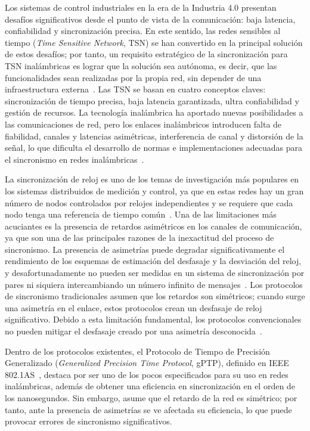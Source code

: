 Los sistemas de control industriales en la era de la Industria 4.0 presentan desafíos significativos desde el punto de vista de la comunicación: baja latencia, confiabilidad y sincronización precisa. En este sentido, las redes sensibles al tiempo (\textit{Time Sensitive Network}, TSN) se han convertido en la principal solución de estos desafíos; por tanto, un requisito estratégico de la sincronización para TSN inalámbricas es lograr que la solución sea autónoma, es decir, que las funcionalidades sean realizadas por la propia red, sin depender de una infraestructura externa~\cite{seijo2022}. Las TSN se basan en cuatro conceptos claves: sincronización de tiempo precisa, baja latencia garantizada, ultra confiabilidad y gestión de recursos. La tecnología inalámbrica ha aportado nuevas posibilidades a las comunicaciones de red, pero los enlaces inalámbricos introducen falta de fiabilidad, canales y latencias asimétricas, interferencia de canal y distorsión de la señal, lo que dificulta el desarrollo de normas e implementaciones adecuadas para el sincronismo en redes inalámbricas~\cite{mildner2019}.

La sincronización de reloj es uno de los temas de investigación más populares en los sistemas distribuidos de medición y control, ya que en estas redes hay un gran número de nodos controlados por relojes independientes y se requiere que cada nodo tenga una referencia de tiempo común~\cite{zhang2024}. Una de las limitaciones más acuciantes es la presencia de retardos asimétricos en los canales de comunicación, ya que son una de las principales razones de la inexactitud del proceso de sincronismo. La presencia de asimetrías puede degradar significativamente el rendimiento de los esquemas de estimación del desfasaje y la desviación del reloj, y desafortunadamente no pueden ser medidas en un sistema de sincronización por pares ni siquiera intercambiando un número infinito de mensajes~\cite{freris2011}. Los protocolos de sincronismo tradicionales asumen que los retardos son simétricos; cuando surge una asimetría en el enlace, estos protocolos crean un desfasaje de reloj significativo. Debido a esta limitación fundamental, los protocolos convencionales no pueden mitigar el desfasaje creado por una asimetría desconocida~\cite{exel2014,oliva2024}.

Dentro de los protocolos existentes, el Protocolo de Tiempo de Precisión Generalizado (\textit{Generalized Precision Time Protocol}, gPTP), definido en IEEE 802.1AS~\cite{ieee8021as_2020}, destaca por ser uno de los pocos especificados para su uso en redes inalámbricas, además de obtener una eficiencia en sincronización en el orden de los nanosegundos. Sin embargo, asume que el retardo de la red es simétrico; por tanto, ante la presencia de asimetrías se ve afectada su eficiencia, lo que puede provocar errores de sincronismo significativos.

